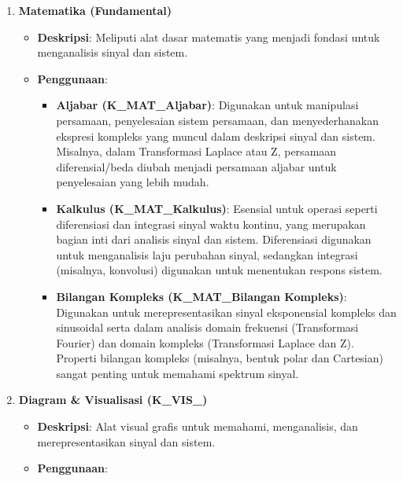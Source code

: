\documentclass[
  letterpaper,
  DIV=11,
  numbers=noendperiod]{scrreprt}
\providecommand{\tightlist}{%
  \setlength{\itemsep}{0pt}\setlength{\parskip}{0pt}}
\begin{document}
\begin{enumerate}
\def\labelenumi{\arabic{enumi}.}
\item
  \textbf{Matematika (Fundamental)}

  \begin{itemize}
  \tightlist
  \item
    \textbf{Deskripsi}: Meliputi alat dasar matematis yang menjadi
    fondasi untuk menganalisis sinyal dan sistem.
  \item
    \textbf{Penggunaan}:

    \begin{itemize}
    \tightlist
    \item
      \textbf{Aljabar (K\_MAT\_Aljabar)}: Digunakan untuk manipulasi
      persamaan, penyelesaian sistem persamaan, dan menyederhanakan
      ekspresi kompleks yang muncul dalam deskripsi sinyal dan sistem.
      Misalnya, dalam Transformasi Laplace atau Z, persamaan
      diferensial/beda diubah menjadi persamaan aljabar untuk
      penyelesaian yang lebih mudah.
    \item
      \textbf{Kalkulus (K\_MAT\_Kalkulus)}: Esensial untuk operasi
      seperti diferensiasi dan integrasi sinyal waktu kontinu, yang
      merupakan bagian inti dari analisis sinyal dan sistem.
      Diferensiasi digunakan untuk menganalisis laju perubahan sinyal,
      sedangkan integrasi (misalnya, konvolusi) digunakan untuk
      menentukan respons sistem.
    \item
      \textbf{Bilangan Kompleks (K\_MAT\_Bilangan Kompleks)}: Digunakan
      untuk merepresentasikan sinyal eksponensial kompleks dan
      sinusoidal serta dalam analisis domain frekuensi (Transformasi
      Fourier) dan domain kompleks (Transformasi Laplace dan Z).
      Properti bilangan kompleks (misalnya, bentuk polar dan Cartesian)
      sangat penting untuk memahami spektrum sinyal.
    \end{itemize}
  \end{itemize}
\item
  \textbf{Diagram \& Visualisasi (K\_VIS\_)}

  \begin{itemize}
  \tightlist
  \item
    \textbf{Deskripsi}: Alat visual grafis untuk memahami, menganalisis,
    dan merepresentasikan sinyal dan sistem.
  \item
    \textbf{Penggunaan}:


\end{itemize}
\end{enumerate}
\end{document}

